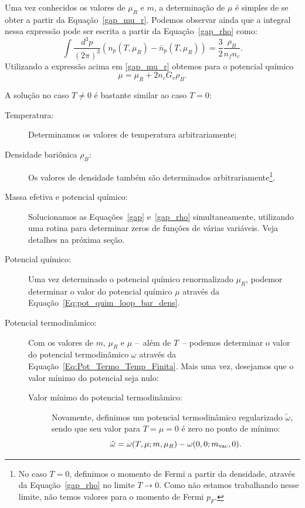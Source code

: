 Uma vez conhecidos os valores de $\mu_R$ e $m$, a determinação de $\mu$ é simples de se obter a partir da Equação~\eqref{gap_mu_r}. Podemos observar ainda que a integral nessa expressão pode ser escrita a partir da Equação~\eqref{gap_rho} como:
\begin{equation}
	\int \frac{d^3p}{(2\pi)^3}(n_p(T, \mu_R) - \bar{n}_p(T, \mu_R)) = \frac{3}{2} \frac{\rho_B}{n_f n_c}.
\end{equation}
%
Utilizando a expressão acima em \eqref{gap_mu_r} obtemos para o potencial químico
\begin{equation}\label{Eq:pot_quim_loop_bar_dens}
	\mu = \mu_R + 2 n_c G_v \rho_B.
\end{equation}

A solução no caso $T \neq 0$ é bastante similar ao caso $T = 0$: 
\begin{description}
	\item[Temperatura:] Determinamos os valores de temperatura arbitrariamente;
	\item[Densidade bariônica $\rho_B$:] Os valores de densidade também são determinados arbitrariamente\footnote{No caso $T = 0$, definimos o momento de Fermi a partir da densidade, através da Equação~\eqref{gap_rho} no limite $T \to 0$. Como não estamos trabalhando nesse limite, não temos valores para o momento de Fermi $p_F$.}.
	\item[Massa efetiva e potencial químico:] Solucionamos as Equações~\eqref{gap} e~\eqref{gap_rho} simultaneamente, utilizando uma rotina para determinar zeros de funções de várias variáveis. Veja detalhes na próxima seção.
	\item[Potencial químico:] Uma vez determinado o potencial químico renormalizado $\mu_R$, podemor determinar o valor do potencial químico $\mu$ através da Equação~\eqref{Eq:pot_quim_loop_bar_dens}.
	\item[Potencial termodinâmico:] Com os valores de $m$, $\mu_R$ e $\mu$ --~além de $T$~-- podemos determinar o valor do potencial termodinâmico $\omega$ através da Equação~\ref{Eq:Pot_Termo_Temp_Finita}. Mais uma vez, desejamos que o valor mínimo do potencial seja nulo:
		\begin{description}
			\item[Valor mínimo do potencial termodinâmico:] Novamente, definimos um potencial termodinâmico regularizado $\tilde\omega$, sendo que seu valor para $T = \mu = 0$ é zero no ponto de mínimo:
				\begin{equation}
					\tilde\omega = \omega(T,\mu;m,\mu_R) - \omega(0,0;m_{\rm{vac}},0).

\end{equation}
\end{description}
\end{description}
